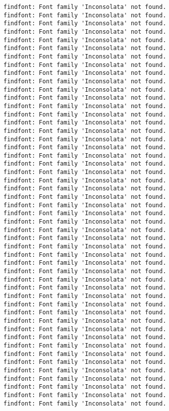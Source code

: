 \documentclass[11pt]{article}
\begin{document}
    \begin{Verbatim}[commandchars=\\\{\}]
findfont: Font family 'Inconsolata' not found.
findfont: Font family 'Inconsolata' not found.
findfont: Font family 'Inconsolata' not found.
findfont: Font family 'Inconsolata' not found.
findfont: Font family 'Inconsolata' not found.
findfont: Font family 'Inconsolata' not found.
findfont: Font family 'Inconsolata' not found.
findfont: Font family 'Inconsolata' not found.
findfont: Font family 'Inconsolata' not found.
findfont: Font family 'Inconsolata' not found.
findfont: Font family 'Inconsolata' not found.
findfont: Font family 'Inconsolata' not found.
findfont: Font family 'Inconsolata' not found.
findfont: Font family 'Inconsolata' not found.
findfont: Font family 'Inconsolata' not found.
findfont: Font family 'Inconsolata' not found.
findfont: Font family 'Inconsolata' not found.
findfont: Font family 'Inconsolata' not found.
findfont: Font family 'Inconsolata' not found.
findfont: Font family 'Inconsolata' not found.
findfont: Font family 'Inconsolata' not found.
findfont: Font family 'Inconsolata' not found.
findfont: Font family 'Inconsolata' not found.
findfont: Font family 'Inconsolata' not found.
findfont: Font family 'Inconsolata' not found.
findfont: Font family 'Inconsolata' not found.
findfont: Font family 'Inconsolata' not found.
findfont: Font family 'Inconsolata' not found.
findfont: Font family 'Inconsolata' not found.
findfont: Font family 'Inconsolata' not found.
findfont: Font family 'Inconsolata' not found.
findfont: Font family 'Inconsolata' not found.
findfont: Font family 'Inconsolata' not found.
findfont: Font family 'Inconsolata' not found.
findfont: Font family 'Inconsolata' not found.
findfont: Font family 'Inconsolata' not found.
findfont: Font family 'Inconsolata' not found.
findfont: Font family 'Inconsolata' not found.
findfont: Font family 'Inconsolata' not found.
findfont: Font family 'Inconsolata' not found.
findfont: Font family 'Inconsolata' not found.
findfont: Font family 'Inconsolata' not found.
findfont: Font family 'Inconsolata' not found.
findfont: Font family 'Inconsolata' not found.
findfont: Font family 'Inconsolata' not found.
findfont: Font family 'Inconsolata' not found.
findfont: Font family 'Inconsolata' not found.
findfont: Font family 'Inconsolata' not found.
findfont: Font family 'Inconsolata' not found.
    \end{Verbatim}

    \begin{center}
    \end{center}
    { \hspace*{\fill} \\}
    
\end{document}
